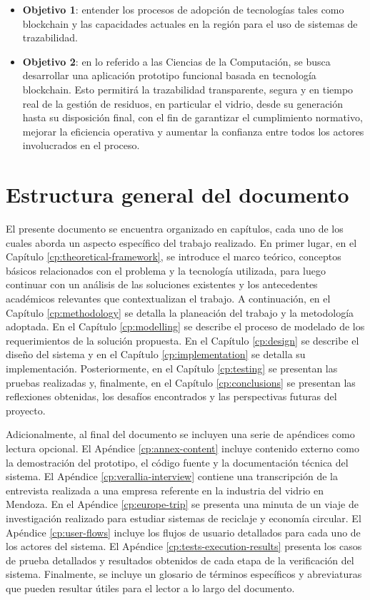 \begin{itemize}
	\item \textbf{Objetivo 1}: entender los procesos de adopción de tecnologías tales como blockchain y las capacidades actuales en la región para el uso de sistemas de trazabilidad.
	\item \textbf{Objetivo 2}: en lo referido a las Ciencias de la Computación, se busca desarrollar una aplicación prototipo funcional basada en tecnología blockchain. Esto permitirá la trazabilidad transparente, segura y en tiempo real de la gestión de residuos, en particular el vidrio, desde su generación hasta su disposición final, con el fin de garantizar el cumplimiento normativo, mejorar la eficiencia operativa y aumentar la confianza entre todos los actores involucrados en el proceso.
\end{itemize}

\section{Estructura general del documento}

El presente documento se encuentra organizado en capítulos, cada uno de los cuales aborda un aspecto específico del trabajo realizado. En primer lugar, en el Capítulo \ref{cp:theoretical-framework}, se introduce el marco teórico, conceptos básicos relacionados con el problema y la tecnología utilizada, para luego continuar con un análisis de las soluciones existentes y los antecedentes académicos relevantes que contextualizan el trabajo. A continuación, en el Capítulo \ref{cp:methodology} se detalla la planeación del trabajo y la metodología adoptada. En el Capítulo \ref{cp:modelling} se describe el proceso de modelado de los requerimientos de la solución propuesta. En el Capítulo \ref{cp:design} se describe el diseño del sistema y en el Capítulo \ref{cp:implementation} se detalla su implementación. Posteriormente, en el Capítulo \ref{cp:testing} se presentan las pruebas realizadas y, finalmente, en el Capítulo \ref{cp:conclusions} se presentan las reflexiones obtenidas, los desafíos encontrados y las perspectivas futuras del proyecto.

Adicionalmente, al final del documento se incluyen una serie de apéndices como lectura opcional. El Apéndice \ref{cp:annex-content} incluye contenido externo como la demostración del prototipo, el código fuente y la documentación técnica del sistema. El Apéndice \ref{cp:verallia-interview} contiene una transcripción de la entrevista realizada a una empresa referente en la industria del vidrio en Mendoza. En el Apéndice \ref{cp:europe-trip} se presenta una minuta de un viaje de investigación realizado para estudiar sistemas de reciclaje y economía circular. El Apéndice \ref{cp:user-flows} incluye los flujos de usuario detallados para cada uno de los actores del sistema. El Apéndice \ref{cp:tests-execution-results} presenta los casos de prueba detallados y resultados obtenidos de cada etapa de la verificación del sistema. Finalmente, se incluye un glosario de términos específicos y abreviaturas que pueden resultar útiles para el lector a lo largo del documento.
